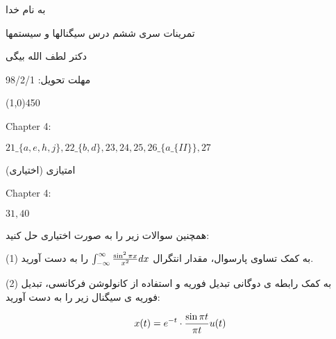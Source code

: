 \documentclass[50pt]{article}
\newcommand{\hl}{
\begin{center}
\line(1,0){450}
\end{center}}
\begin{document}
\setLTR 




\begin{RTL}
\Large{








\begin{center}
به نام خدا

تمرینات سری ششم درس سیگنالها و سیستمها

دکتر لطف الله بیگی

مهلت تحویل: 98/2/1
\end{center}

\hl
\begin{latin}
Chapter 4:

$21\_\{a,e,h,j\} , 22\_\{b,d\} , 23 ,24 ,25 , 26\_\Big\{a\_\{II\}\Big\} , 27 $
\end{latin}

امتیازی (اختیاری)

\begin{latin}
Chapter 4:

$31,40$
\end{latin}
 
همچنین سوالات زیر را به صورت اختیاری حل کنید:

(1) به کمک تساوی پارسوال، مقدار انتگرال 
$\int_{-\infty}^{\infty}{\sin^2\pi x\over x^2}dx$
 را  به دست آورید.

(2) به کمک رابطه ی دوگانی تبدیل فوریه و استفاده از کانولوشن فرکانسی، تبدیل فوریه ی سیگنال زیر را به دست آورید:

$$x(t)=e^{-t}\cdot{\sin \pi t\over \pi t}u(t)$$




}





\end{RTL}
\end{document}
